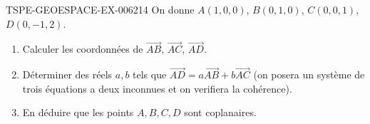 \begin{exercice}{TSPE-GEOESPACE-EX-006}{2}{14}
On donne $A(1,0,0)$, $B(0,1,0)$, $C(0,0,1)$, $D(0,-1,2)$.
\begin{enumerate}
  \item Calculer les coordonnées de $\vec{AB}$, $\vec{AC}$, $\vec{AD}$.
  \item Déterminer des réels $a,b$ tels que $\vec{AD}=a\vec{AB}+b\vec{AC}$ (on posera un système de trois équations a deux inconnues et on verifiera la cohérence).
  \item En déduire que les points $A,B,C,D$ sont coplanaires.
\end{enumerate}
\end{exercice}

